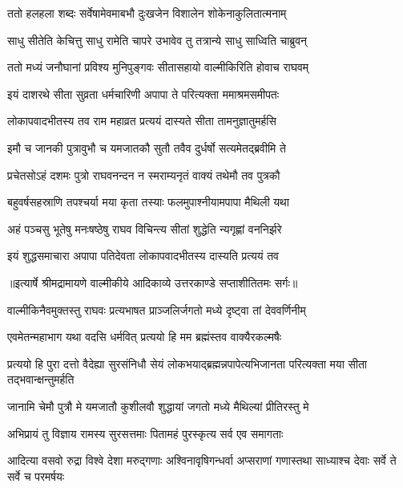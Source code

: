 \twolineshloka
{ततो हलहला शब्दः सर्वेषामेवमाबभौ}
{दुःखजेन विशालेन शोकेनाकुलितात्मनाम्} %

\twolineshloka
{साधु सीतेति केचित्तु साधु रामेति चापरे}
{उभावेव तु तत्रान्ये साधु साध्विति चाब्रुवन्} %

\twolineshloka
{ततो मध्यं जनौघानां प्रविश्य मुनिपुङ्गवः}
{सीतासहायो वाल्मीकिरिति होवाच राघवम्} %

\twolineshloka
{इयं दाशरथे सीता सुव्रता धर्मचारिणी}
{अपापा ते परित्यक्ता ममाश्रमसमीपतः} %

\twolineshloka
{लोकापवादभीतस्य तव राम महाव्रत}
{प्रत्ययं दास्यते सीता तामनुज्ञातुमर्हसि} %

\twolineshloka
{इमौ च जानकी पुत्रावुभौ च यमजातकौ}
{सुतौ तवैव दुर्धर्षो सत्यमेतद्ब्रवीमि ते} %

\twolineshloka
{प्रचेतसोऽहं दशमः पुत्रो राघवनन्दन}
{न स्मराम्यनृतं वाक्यं तथेमौ तव पुत्रकौ} %

\twolineshloka
{बहुवर्षसहस्राणि तपश्चर्या मया कृता}
{तस्याः फलमुपाश्नीयामपापा मैथिली यथा} %

\twolineshloka
{अहं पञ्चसु भूतेषु मनःषष्ठेषु राघव}
{विचिन्त्य सीतां शुद्धेति न्यगृह्णां वननिर्झरे} %

\twolineshloka
{इयं शुद्धसमाचारा अपापा पतिदेवता}
{लोकापवादभीतस्य दास्यति प्रत्ययं तव} %


{॥इत्यार्षे श्रीमद्रामायणे वाल्मीकीये आदिकाव्ये उत्तरकाण्डे सप्ताशीतितमः सर्गः॥}


\twolineshloka
{वाल्मीकिनैवमुक्तस्तु राघवः प्रत्यभाषत}
{प्राञ्जलिर्जगतो मध्ये दृष्ट्वा तां देववर्णिनीम्} %

\twolineshloka
{एवमेतन्महाभाग यथा वदसि धर्मवित्}
{प्रत्ययो हि मम ब्रह्मंस्तव वाक्यैरकल्मषैः} %

\threelineshloka
{प्रत्ययो हि पुरा दत्तो वैदेह्या सुरसंनिधौ}
{सेयं लोकभयाद्ब्रह्मन्नपापेत्यभिजानता}
{परित्यक्ता मया सीता तद्भवान्क्षन्तुमर्हति} %

\twolineshloka
{जानामि चेमौ पुत्रौ मे यमजातौ कुशीलवौ}
{शुद्धायां जगतो मध्ये मैथिल्यां प्रीतिरस्तु मे} %

\twolineshloka
{अभिप्रायं तु विज्ञाय रामस्य सुरसत्तमाः}
{पितामहं पुरस्कृत्य सर्व एव समागताः} %

\threelineshloka
{आदित्या वसवो रुद्रा विश्वे देशा मरुद्गणाः}
{अश्विनावृषिगन्धर्वा अप्सराणां गणास्तथा}
{साध्याश्च देवाः सर्वे ते सर्वे च परमर्षयः} %

